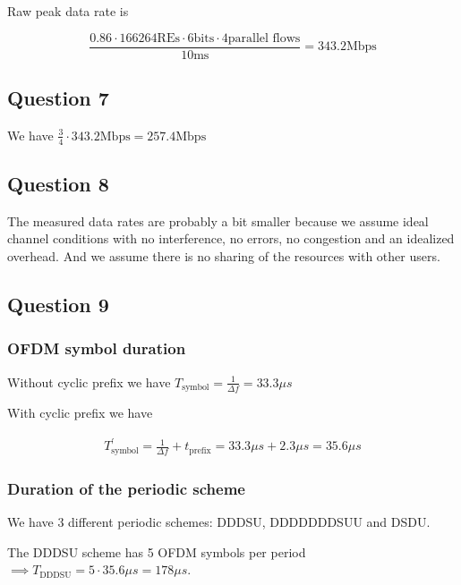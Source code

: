 \documentclass[]{article}
\begin{document}
	Raw peak data rate is
	
	\begin{equation}
		\frac{0.86 \cdot 166264 \text{REs} \cdot 6 \text{bits} \cdot 4 \text{parallel flows}}{10 \text{ms}} = 343.2 \text{Mbps}
	\end{equation}
	
	\subsection*{Question 7}
	
	We have $\frac{3}{4} \cdot 343.2 \text{Mbps} = 257.4 \text{Mbps}$
	
	\subsection*{Question 8}
	
	The measured data rates are probably a bit smaller because we assume ideal channel conditions with no interference, no errors, no congestion and an idealized overhead. And we assume there is no sharing of the resources with other users.
	
	\subsection*{Question 9}
	
	\subsubsection*{OFDM symbol duration}
	
	Without cyclic prefix we have $T_{\text{symbol}} = \frac{1}{\Delta f} = 33.3 \mu s$
	
	With cyclic prefix we have
	
	\begin{align}
		T_{\text{symbol}}^\prime = \frac{1}{\Delta f} + t_{\text{prefix}} = 33.3\mu s + 2.3\mu s = 35.6 \mu s
	\end{align}
	
	\subsubsection*{Duration of the periodic scheme}
	
	We have 3 different periodic schemes: DDDSU, DDDDDDDSUU and DSDU.
	
	The DDDSU scheme has 5 OFDM symbols per period $\implies T_{\text{DDDSU}} = 5 \cdot 35.6 \mu s = 178 \mu s$.
	
\end{document}
